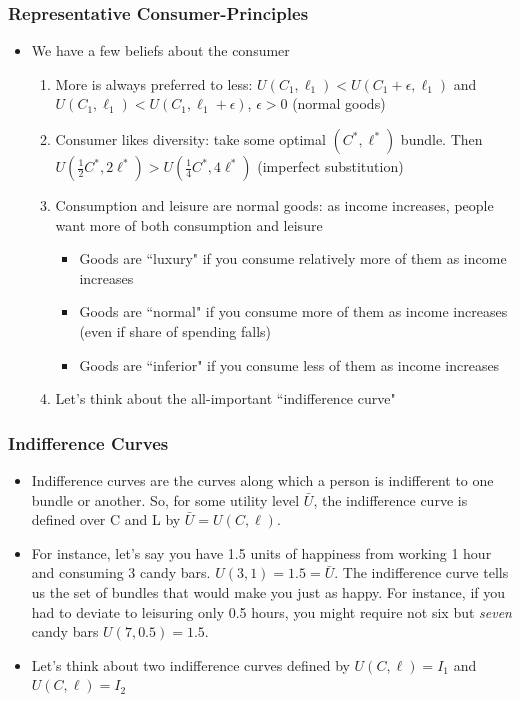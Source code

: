 \documentclass{beamer}
\begin{document}
\begin{frame}
\frametitle[alignment=center]{Representative Consumer-Principles}
\begin{itemize}
\item We have a few beliefs about the consumer
\begin{enumerate}
\item More is always preferred to less: $U(C_1,\ell_1)<U(C_1+\epsilon,\ell_1)$ and $U(C_1,\ell_1)<U(C_1,\ell_1+\epsilon)$, $\epsilon>0$ (normal goods)
\bigskip
\item Consumer likes diversity: take some optimal $(C^*,\ell^*)$ bundle.  Then $U(\frac{1}{2}C^*,2\ell^*)>U(\frac{1}{4}C^*,4\ell^*)$  (imperfect substitution)
\bigskip
\item Consumption and leisure are normal goods: as income increases, people want more of both consumption and leisure
\begin{itemize}
\item Goods are ``luxury" if you consume relatively more of them as income increases
\item Goods are ``normal" if you consume more of them as income increases (even if share of spending falls)
\item Goods are ``inferior" if you consume less of them as income increases
\end{itemize}
\item Let's think about the all-important ``indifference curve"
\end{enumerate}
\end{itemize}
\end{frame}




\begin{frame}
\frametitle[alignment=center]{Indifference Curves}
\begin{itemize}
\item Indifference curves are the curves along which a person is indifferent to one bundle or another.  So, for some utility level $\bar{U}$, the indifference curve is defined over C and L by $\bar{U}=U(C,\ell)$.
\bigskip
\item For instance, let's say you have 1.5 units of happiness from working 1 hour and consuming 3 candy bars.  $U(3,1)=1.5=\bar{U}$.  The indifference curve tells us the set of bundles that would make you just as happy.  For instance, if you had to deviate to leisuring only 0.5 hours, you might require not six but \emph{seven} candy bars $U(7,0.5)=1.5$.  
\bigskip
\item Let's think about two indifference curves defined by $U(C,\ell)=I_1$ and  $U(C,\ell)=I_2$
\end{itemize}
\end{frame}
\end{document}
